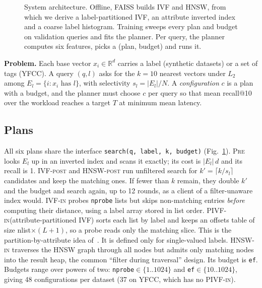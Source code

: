 \documentclass[sigconf,nonacm]{acmart}
\newcommand{\pre}{\textsc{Pre}\xspace}
\newcommand{\ivfpost}{\textsc{IVF-post}\xspace}
\newcommand{\ivfin}{\textsc{IVF-in}\xspace}
\newcommand{\pivfin}{\textsc{PIVF-in}\xspace}
\newcommand{\hnswpost}{\textsc{HNSW-post}\xspace}
\newcommand{\hnswin}{\textsc{HNSW-in}\xspace}
\begin{document}
\begin{figure}[t]
\caption{System architecture. Offline, FAISS builds IVF and HNSW, from which we derive a label-partitioned IVF, an attribute inverted index and a coarse label histogram. Training sweeps every plan and budget on validation queries and fits the planner. Per query, the planner computes six features, picks a (plan, budget) and runs it.}
\label{fig:arch}
\end{figure}

\textbf{Problem.} Each base vector $x_i\in\mathbb{R}^d$ carries a label (synthetic datasets) or a set of tags (YFCC). A query $(q,l)$ asks for the $k=10$ nearest vectors under $L_2$ among $E_l=\{i: x_i \text{ has } l\}$, with selectivity $s_l=|E_l|/N$. A \emph{configuration} $c$ is a plan with a budget, and the planner must choose $c$ per query so that mean recall@10 over the workload reaches a target $T$ at minimum mean latency.

\subsection{Plans}
All six plans share the interface \texttt{search(q, label, k, budget)} (Fig.~\ref{fig:arch}).
\pre looks $E_l$ up in an inverted index and scans it exactly; its cost is $|E_l|\,d$ and its recall is 1.
\ivfpost and \hnswpost run unfiltered search for $k'=\lceil k/s_l\rceil$ candidates and keep the matching ones. If fewer than $k$ remain, they double $k'$ and the budget and search again, up to 12 rounds, as a client of a filter-unaware index would.
\ivfin probes \texttt{nprobe} lists but skips non-matching entries \emph{before} computing their distance, using a label array stored in list order.
\pivfin (attribute-partitioned IVF) sorts each list by label and keeps an offsets table of size nlist$\times(L{+}1)$, so a probe reads only the matching slice. This is the partition-by-attribute idea of~\cite{wang2021milvus,gupta2023caps}. It is defined only for single-valued labels.
\hnswin traverses the HNSW graph through all nodes but admits only matching nodes into the result heap, the common ``filter during traversal'' design. Its budget is \texttt{ef}.
Budgets range over powers of two: \texttt{nprobe}$\in\{1..1024\}$ and \texttt{ef}$\in\{10..1024\}$, giving 48 configurations per dataset (37 on YFCC, which has no \pivfin).
\end{document}
